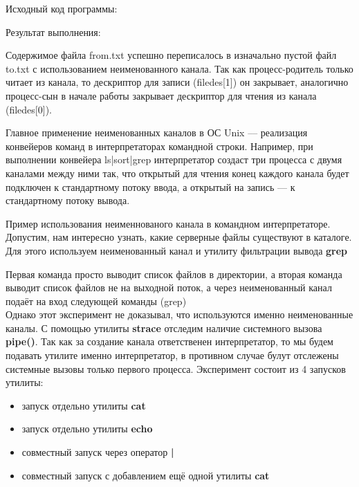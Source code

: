 \documentclass[a4paper]{article}
\begin{document}
	Исходный код программы:
	
	
	Результат выполнения:
	

	Содержимое файла from.txt успешно переписалось в изначально пустой файл to.txt с использованием неименованного канала.	Так как процесс-родитель только читает из канала, то дескриптор для записи (filedes[1]) он закрывает, аналогично процесс-сын в начале работы закрывает дескриптор для чтения из канала (filedes[0]).

	Главное применение неименованных каналов в ОС Unix --– реализация конвейеров команд в интерпретаторах командной строки. Например, при выполнении конвейера ls|sort|grep интерпретатор создаст три процесса с двумя каналами между ними так, что открытый для чтения конец каждого канала будет подключен к стандартному потоку ввода, а открытый на запись — к стандартному потоку вывода.
	
	Пример использования неименнованого канала в командном интерпретаторе. Допустим, нам интересно узнать, какие серверные файлы существуют в каталоге. Для этого используем неименованный канал и утилиту фильтрации вывода \textbf{grep}
	
	Первая команда просто выводит список файлов в директории, а вторая команда выводит список файлов не на выходной поток, а через неименованный канал подаёт на вход следующей команды (grep)\\
	
	Однако этот эксперимент не доказывал, что используются именно неименованные каналы. С помощью утилиты \textbf{strace} отследим наличие системного вызова \textbf{pipe()}. Так как за создание канала ответственен интерпретатор, то мы будем подавать утилите именно интерпретатор, в противном случае булут отслежены системные вызовы только первого процесса. Эксперимент состоит из 4 запусков утилиты:
	\begin{itemize}
		\item запуск отдельно утилиты \textbf{cat}
		\item запуск отдельно утилиты \textbf{echo}
		\item совместный запуск через оператор \textbf{|}
		\item совместный запуск с добавлением ещё одной утилиты \textbf{cat}
	\end{itemize}	 
	
	
	
\end{document}
